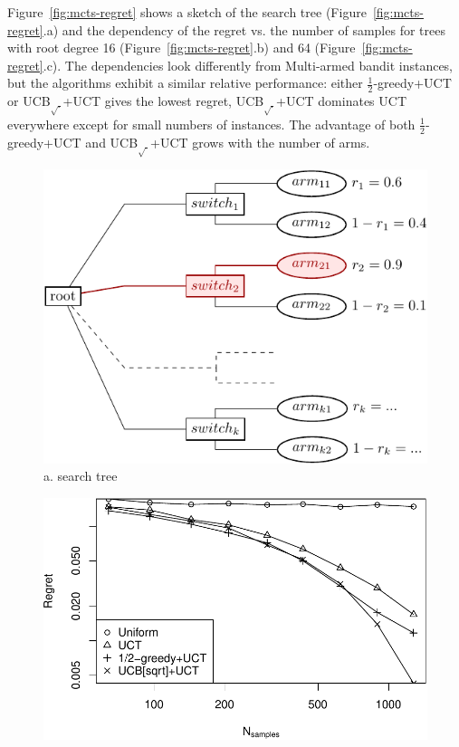 \documentclass[letterpaper]{article}
\begin{document}
Figure~\ref{fig:mcts-regret} shows a sketch of the search tree
(Figure~\ref{fig:mcts-regret}.a) and the dependency of the regret vs. the
number of samples for trees with root degree 16
(Figure~\ref{fig:mcts-regret}.b) and 64 (Figure~\ref{fig:mcts-regret}.c). The
dependencies look differently from Multi-armed bandit instances, but
the algorithms exhibit a similar relative performance: either $\frac 1
2$-greedy+UCT or UCB$_{\sqrt{\cdot}}$+UCT
gives the lowest regret, UCB$_{\sqrt{\cdot}}$+UCT dominates UCT everywhere
except for small numbers of instances. The advantage of both $\frac 1
2$-greedy+UCT and UCB$_{\sqrt{\cdot}}$+UCT grows with the number of arms.

\begin{figure}[h!]
  \begin{minipage}[c]{1.0\linewidth}
    \centering
    \includegraphics[scale=0.8]{twolevel-tree.pdf}\\
    a. search tree
    \vspace{1em}
  \end{minipage}
  \begin{minipage}[c]{1.0\linewidth}
    \centering
    \includegraphics[scale=0.5]{tree-identity-k=16-uqb=8.pdf}\\ 

\end{minipage}
\end{figure}
\end{document}
